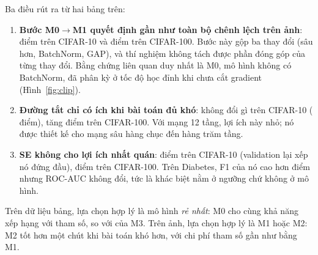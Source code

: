 \begin{table}[H]
  \centering
  \caption{Tổng hợp 12 lượt chạy trên tập test}
  \label{tab:tonghop}
  \small
\end{table}

Ba điều rút ra từ hai bảng trên:

\begin{enumerate}
  \item \textbf{Bước M0$\to$M1 quyết định gần như toàn bộ chênh lệch trên ảnh}:  điểm
        trên CIFAR-10 và  điểm trên CIFAR-100. Bước này gộp ba thay đổi (sâu hơn,
        BatchNorm, GAP), và thí nghiệm không tách được phần đóng góp của từng thay đổi. Bằng chứng liên quan duy nhất
        là M0, mô hình không có BatchNorm, đã phân kỳ ở tốc độ học đỉnh khi chưa cắt gradient (Hình~\ref{fig:clip}).
  \item \textbf{Đường tắt chỉ có ích khi bài toán đủ khó}: không đổi gì trên CIFAR-10 (
        điểm), tăng  điểm trên CIFAR-100. Với mạng 12 tầng, lợi ích này nhỏ; nó được
        thiết kế cho mạng sâu hàng chục đến hàng trăm tầng.
  \item \textbf{SE không cho lợi ích nhất quán}:  điểm trên CIFAR-10 (validation
        lại xếp nó đứng đầu),  điểm trên CIFAR-100. Trên Diabetes, F1 của nó cao hơn
         điểm nhưng ROC-AUC không đổi, tức là khác biệt nằm ở ngưỡng chứ không ở
        mô hình.
\end{enumerate}

Trên dữ liệu bảng, lựa chọn hợp lý là mô hình \emph{rẻ nhất}: M0 cho cùng khả năng xếp hạng với 
tham số, so với  của M3. Trên ảnh, lựa chọn hợp lý là M1 hoặc M2: M2 tốt hơn một chút khi bài toán khó hơn, với chi phí tham số gần như bằng M1.
